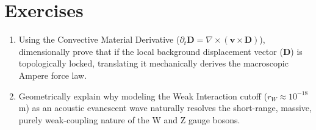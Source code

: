 \section*{Exercises}
\begin{enumerate}
    \item Using the Convective Material Derivative ($\partial_t \mathbf{D} = \nabla \times (\mathbf{v} \times \mathbf{D})$), dimensionally prove that if the local background displacement vector ($\mathbf{D}$) is topologically locked, translating it mechanically derives the macroscopic Ampere force law.
    \item Geometrically explain why modeling the Weak Interaction cutoff ($r_W \approx 10^{-18}$ m) as an acoustic evanescent wave naturally resolves the short-range, massive, purely weak-coupling nature of the W and Z gauge bosons.
\end{enumerate}
%

